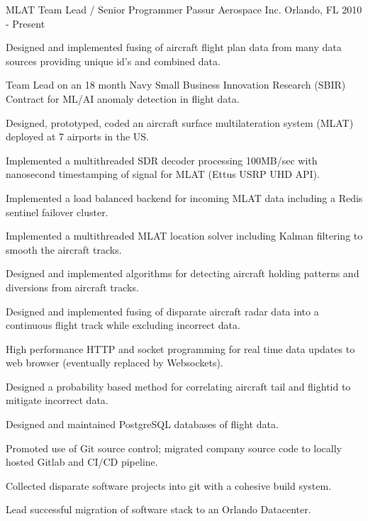 

\begin{cventries}

  \cventry
    {MLAT Team Lead / Senior Programmer} %
    {Passur Aerospace Inc.} %
    {Orlando, FL} %
    {2010 - Present} %
    {
      \begin{cvitems} %
        \item {Designed and implemented fusing of aircraft flight plan data from many data sources providing unique id's and combined data.}
        \item {Team Lead on an 18 month Navy Small Business Innovation Research (SBIR) Contract for ML/AI anomaly detection in flight data.}
        \item {Designed, prototyped, coded an aircraft surface multilateration system (MLAT) deployed at 7 airports in the US.}
	\item {Implemented a multithreaded SDR decoder processing 100MB/sec with nanosecond timestamping of signal for MLAT (Ettus USRP UHD API).}
        \item {Implemented a load balanced backend for incoming MLAT data including a Redis sentinel failover cluster.}
        \item {Implemented a multithreaded MLAT location solver including Kalman filtering to smooth the aircraft tracks.}
        \item {Designed and implemented algorithms for detecting aircraft holding patterns and diversions from aircraft tracks.}
        \item {Designed and implemented fusing of disparate aircraft radar data into a continuous flight track while excluding incorrect data.}
        \item {High performance HTTP and socket programming for real time data updates to web browser (eventually replaced by Websockets).}
        \item {Designed a probability based method for correlating aircraft tail and flightid to mitigate incorrect data.}
        \item {Designed and maintained PostgreSQL databases of flight data.}
        \item {Promoted use of Git source control; migrated company source code to locally hosted Gitlab and CI/CD pipeline.}
        \item {Collected disparate software projects into git with a cohesive build system.}
        \item {Lead successful migration of software stack to an Orlando Datacenter.}
      \end{cvitems}
    }


\end{cventries}
